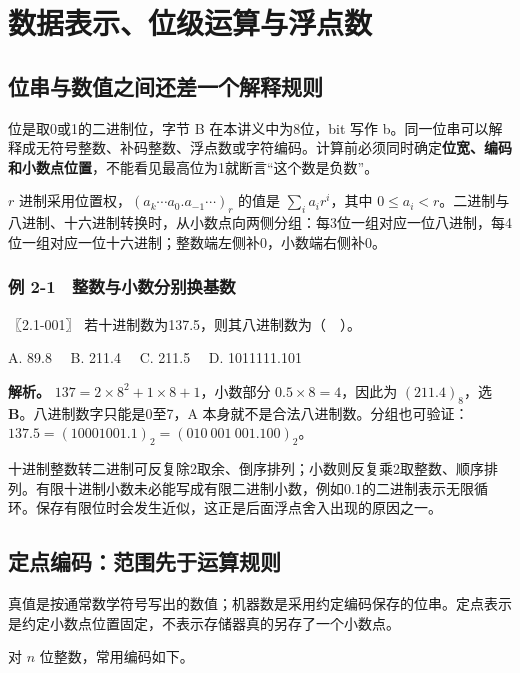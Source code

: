 \section{数据表示、位级运算与浮点数}\label{co-ch2}

\subsection{位串与数值之间还差一个解释规则}\label{co-02-01}

位是取0或1的二进制位，字节 B 在本讲义中为8位，bit 写作 b。同一位串可以解释成无符号整数、补码整数、浮点数或字符编码。计算前必须同时确定\textbf{位宽、编码和小数点位置}，不能看见最高位为1就断言``这个数是负数''。

\(r\) 进制采用位置权，\((a_k\cdots a_0.a_{-1}\cdots)_r\) 的值是 \(\sum_i a_i r^i\)，其中 \(0\le a_i<r\)。二进制与八进制、十六进制转换时，从小数点向两侧分组：每3位一组对应一位八进制，每4位一组对应一位十六进制；整数端左侧补0，小数端右侧补0。

\subsubsection{例 2-1　整数与小数分别换基数}\label{co-ex2-1}

\noindent{}〖2.1-001〗 若十进制数为137.5，则其八进制数为（　）。

A. 89.8　 B. 211.4　 C. 211.5　 D. 1011111.101


\textbf{解析。} \(137=2\times8^2+1\times8+1\)，小数部分 \(0.5\times8=4\)，因此为 \((211.4)_8\)，选 \textbf{B}。八进制数字只能是0至7，A 本身就不是合法八进制数。分组也可验证：\(137.5=(10001001.1)_2=(010\ 001\ 001.100)_2\)。

十进制整数转二进制可反复除2取余、倒序排列；小数则反复乘2取整数、顺序排列。有限十进制小数未必能写成有限二进制小数，例如0.1的二进制表示无限循环。保存有限位时会发生近似，这正是后面浮点舍入出现的原因之一。

\subsection{定点编码：范围先于运算规则}\label{co-02-02}

真值是按通常数学符号写出的数值；机器数是采用约定编码保存的位串。定点表示是约定小数点位置固定，不表示存储器真的另存了一个小数点。

对 \(n\) 位整数，常用编码如下。

